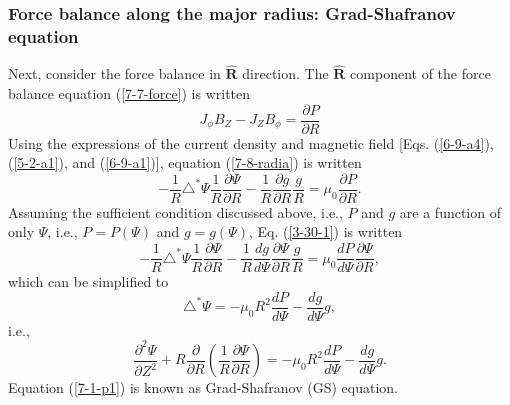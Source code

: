 \documentclass{llncs}
\begin{document}
\subsubsection{Force balance along the major radius: Grad-Shafranov equation}

Next, consider the force balance in $\hat{\mathbf{R}}$ direction. The
$\hat{\mathbf{R}}$ component of the force balance equation (\ref{7-7-force})
is written
\begin{equation}
  \label{7-8-radia} J_{\phi} B_Z - J_Z B_{\phi} = \frac{\partial P}{\partial
  R}
\end{equation}
Using the expressions of the current density and magnetic field [Eqs.
(\ref{6-9-a4}), (\ref{5-2-a1}), and (\ref{6-9-a1})], equation
(\ref{7-8-radia}) is written
\begin{equation}
  \label{3-30-1} - \frac{1}{R} \triangle^{\ast} \Psi \frac{1}{R}
  \frac{\partial \Psi}{\partial R} - \frac{1}{R} \frac{\partial g}{\partial R}
  \frac{g}{R} = \mu_0 \frac{\partial P}{\partial R} .
\end{equation}
Assuming the sufficient condition discussed above, i.e., $P$ and $g$ are a
function of only $\Psi$, i.e., $P = P (\Psi)$ and $g = g (\Psi)$, Eq.
(\ref{3-30-1}) is written
\begin{equation}
  - \frac{1}{R} \triangle^{\ast} \Psi \frac{1}{R} \frac{\partial
  \Psi}{\partial R} - \frac{1}{R} \frac{d g}{d \Psi} \frac{\partial
  \Psi}{\partial R}  \frac{g}{R} = \mu_0 \frac{d P}{d \Psi} \frac{\partial
  \Psi}{\partial R},
\end{equation}
which can be simplified to
\begin{equation}
  \triangle^{\ast} \Psi = - \mu_0 R^2 \frac{d P}{d \Psi} - \frac{d g}{d \Psi}
  g,
\end{equation}
i.e.,
\begin{equation}
  \label{7-1-p1} \frac{\partial^2 \Psi}{\partial Z^2} + R
  \frac{\partial}{\partial R} \left( \frac{1}{R} \frac{\partial \Psi}{\partial
  R} \right) = - \mu_0 R^2 \frac{d P}{d \Psi} - \frac{d g}{d \Psi} g.
\end{equation}
Equation (\ref{7-1-p1}) is known as Grad-Shafranov (GS) equation.
\end{document}
